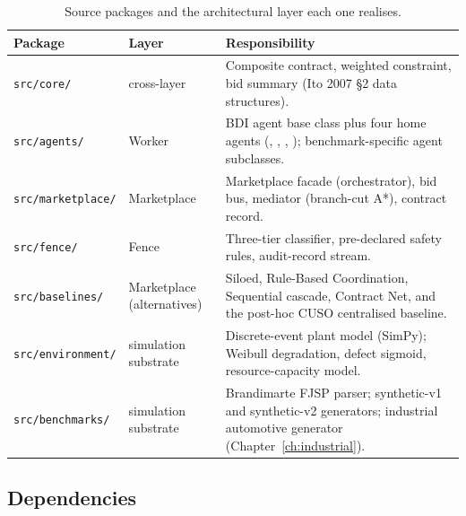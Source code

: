 \begin{table}[ht]
\centering
\caption{Source packages and the architectural layer each one realises.}
\label{tab:impl-packages}
\small
\begin{tabularx}{\textwidth}{@{}l l X@{}}
\toprule
\textbf{Package} & \textbf{Layer} & \textbf{Responsibility} \\
\midrule
\texttt{src/core/}        & cross-layer
                          & Composite contract, weighted constraint,
                            bid summary (Ito 2007 §2 data structures). \\
\addlinespace
\texttt{src/agents/}      & Worker
                          & BDI agent base class plus four home agents
                            (\PSA{}, \PMA{}, \QCA{}, \SCA{}); benchmark-specific
                            agent subclasses. \\
\addlinespace
\texttt{src/marketplace/} & Marketplace
                          & Marketplace facade (orchestrator), bid bus,
                            mediator (branch-cut A*), contract record. \\
\addlinespace
\texttt{src/fence/}       & Fence
                          & Three-tier classifier, pre-declared safety
                            rules, audit-record stream. \\
\addlinespace
\texttt{src/baselines/}   & Marketplace (alternatives)
                          & Siloed, Rule-Based Coordination, Sequential
                            cascade, Contract Net, and the post-hoc
                            CUSO centralised baseline. \\
\addlinespace
\texttt{src/environment/} & simulation substrate
                          & Discrete-event plant model (SimPy);
                            Weibull degradation, defect sigmoid,
                            resource-capacity model. \\
\addlinespace
\texttt{src/benchmarks/}  & simulation substrate
                          & Brandimarte FJSP parser; synthetic-v1 and
                            synthetic-v2 generators; industrial
                            automotive generator (Chapter~\ref{ch:industrial}). \\
\bottomrule
\end{tabularx}
\end{table}

\subsection{Dependencies}

